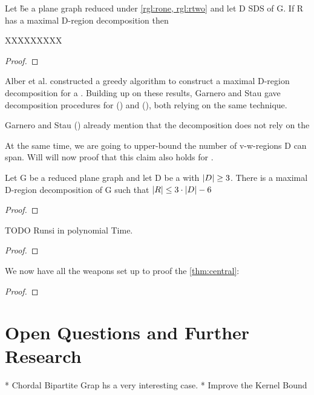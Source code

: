 \begin{lemma}
Let \G be a plane graph reduced under \cref*{rgl:rone, rgl:rtwo} and let D SDS of G. If R has a maximal D-region decomposition then

XXXXXXXXX

\end{lemma}
\begin{proof} 

\end{proof}



Alber et al. \cite[p. ]{Alber2004} constructed a greedy algorithm to construct a maximal D-region decomposition for a \dom. Building up on these results, Garnero and Stau gave decomposition procedures for \rbdom (\cite{Garnero2017a}) and \tdom (\cite{Garnero2018}), both relying on the same technique. 

Garnero and Stau (\cite[p. 15]{Garnero2014}) already mention that the decomposition does not rely on the 

At the same time, we are going to upper-bound the number of v-w-regions D can span. Will will now proof that this claim also holds for \sdom. 

\begin{lemma}
    Let G be a reduced plane graph and let D be a \sdom with $\abs{D}\geq 3$. There is a maximal D-region decomposition of G such that $\abs{R} \leq 3 \cdot \abs{D} - 6$
\end{lemma}

\begin{proof} 
\end{proof}


\begin{lemma}
TODO Runsi in polynomial Time. 
\end{lemma}
\begin{proof} 
\end{proof}

We now have all the weapons set up to proof the \cref{thm:central}: 

\centraltheo*
\begin{proof}
\end{proof}

\chapter{Open Questions and Further Research}

* Chordal Bipartite Grap hs a very interesting case.
* Improve the Kernel Bound